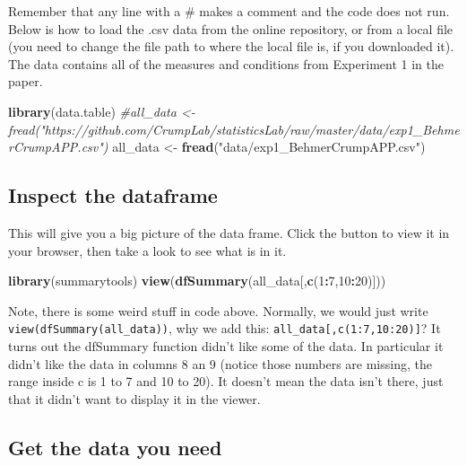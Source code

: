 \documentclass[
]{book}
\newenvironment{Shaded}{\begin{snugshade}}{\end{snugshade}}
\newcommand{\CommentTok}[1]{\textcolor[rgb]{0.56,0.35,0.01}{\textit{#1}}}
\newcommand{\DecValTok}[1]{\textcolor[rgb]{0.00,0.00,0.81}{#1}}
\newcommand{\FunctionTok}[1]{\textcolor[rgb]{0.13,0.29,0.53}{\textbf{#1}}}
\newcommand{\NormalTok}[1]{#1}
\newcommand{\OtherTok}[1]{\textcolor[rgb]{0.56,0.35,0.01}{#1}}
\newcommand{\SpecialCharTok}[1]{\textcolor[rgb]{0.81,0.36,0.00}{\textbf{#1}}}
\newcommand{\StringTok}[1]{\textcolor[rgb]{0.31,0.60,0.02}{#1}}
\begin{document}
Remember that any line with a \# makes a comment and the code does not run. Below is how to load the .csv data from the online repository, or from a local file (you need to change the file path to where the local file is, if you downloaded it). The data contains all of the measures and conditions from Experiment 1 in the paper.

\begin{Shaded}
\begin{Highlighting}[]
\FunctionTok{library}\NormalTok{(data.table)}
\CommentTok{\#all\_data \textless{}{-} fread("https://github.com/CrumpLab/statisticsLab/raw/master/data/exp1\_BehmerCrumpAPP.csv")}
\NormalTok{all\_data }\OtherTok{\textless{}{-}} \FunctionTok{fread}\NormalTok{(}\StringTok{"data/exp1\_BehmerCrumpAPP.csv"}\NormalTok{)}
\end{Highlighting}
\end{Shaded}

\hypertarget{inspect-the-dataframe-1}{%
\subsection{Inspect the dataframe}\label{inspect-the-dataframe-1}}

This will give you a big picture of the data frame. Click the button to view it in your browser, then take a look to see what is in it.

\begin{Shaded}
\begin{Highlighting}[]
\FunctionTok{library}\NormalTok{(summarytools)}
\FunctionTok{view}\NormalTok{(}\FunctionTok{dfSummary}\NormalTok{(all\_data[,}\FunctionTok{c}\NormalTok{(}\DecValTok{1}\SpecialCharTok{:}\DecValTok{7}\NormalTok{,}\DecValTok{10}\SpecialCharTok{:}\DecValTok{20}\NormalTok{)]))}
\end{Highlighting}
\end{Shaded}

Note, there is some weird stuff in code above. Normally, we would just write \texttt{view(dfSummary(all\_data))}, why we add this: \texttt{all\_data{[},c(1:7,10:20){]}}? It turns out the dfSummary function didn't like some of the data. In particular it didn't like the data in columns 8 an 9 (notice those numbers are missing, the range inside c is 1 to 7 and 10 to 20). It doesn't mean the data isn't there, just that it didn't want to display it in the viewer.

\hypertarget{get-the-data-you-need-1}{%
\subsection{Get the data you need}\label{get-the-data-you-need-1}}
\end{document}

